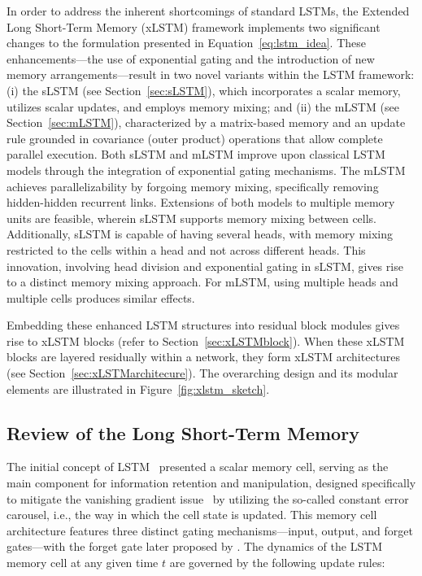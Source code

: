 In order to address the inherent shortcomings of standard LSTMs, the Extended Long Short-Term Memory (xLSTM) framework implements two significant changes to the formulation presented in Equation~\eqref{eq:lstm_idea}. These enhancements---the use of exponential gating and the introduction of new memory arrangements---result in two novel variants within the LSTM framework: (i) the sLSTM (see Section~\ref{sec:sLSTM}), which incorporates a scalar memory, utilizes scalar updates, and employs memory mixing; and (ii) the mLSTM (see Section~\ref{sec:mLSTM}), characterized by a matrix-based memory and an update rule grounded in covariance (outer product) operations that allow complete parallel execution. Both sLSTM and mLSTM improve upon classical LSTM models through the integration of exponential gating mechanisms. The mLSTM achieves parallelizability by forgoing memory mixing, specifically removing hidden-hidden recurrent links. Extensions of both models to multiple memory units are feasible, wherein sLSTM supports memory mixing between cells. Additionally, sLSTM is capable of having several heads, with memory mixing restricted to the cells within a head and not across different heads. This innovation, involving head division and exponential gating in sLSTM, gives rise to a distinct memory mixing approach. For mLSTM, using multiple heads and multiple cells produces similar effects.

Embedding these enhanced LSTM structures into residual block modules gives rise to xLSTM blocks (refer to Section~\ref{sec:xLSTMblock}). When these xLSTM blocks are layered residually within a network, they form xLSTM architectures (see Section~\ref{sec:xLSTMarchitecure}). The overarching design and its modular elements are illustrated in Figure~\ref{fig:xlstm_sketch}.

\subsection{Review of the Long Short-Term Memory}
\label{sec:orgLSTM}

The initial concept of LSTM~\citep{Hochreiter:91,Hochreiter:97nips,Hochreiter:97} presented a scalar memory cell, serving as the main component for information retention and manipulation, designed specifically to mitigate the vanishing gradient issue~\citep{Hochreiter:91,Hochreiter:00book} by utilizing the so-called constant error carousel, i.e., the way in which the cell state is updated. This memory cell architecture features three distinct gating mechanisms—input, output, and forget gates—with the forget gate later proposed by \citet{Gers:00}. The dynamics of the LSTM memory cell at any given time $t$ are governed by the following update rules:

